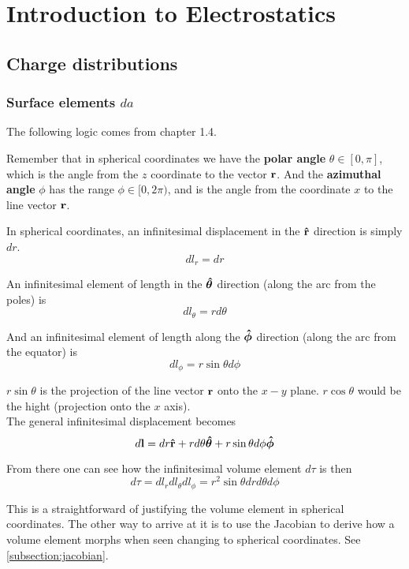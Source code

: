 \chapter{Introduction to Electrostatics}


\section{Charge distributions}


\subsection{Surface elements $da$}

The following logic comes from \cite{griffiths-em} chapter 1.4.

Remember that in spherical coordinates we have the \textbf{polar angle} $\theta \in [0, \pi]$,
which is the angle from the $z$ coordinate to the vector $\boldsymbol{\mathbf{r}}$.
And the \textbf{azimuthal angle} $\phi$ has the range $\phi \in [0, 2\pi)$, and is the angle from
the coordinate $x$ to the line vector $\boldsymbol{\mathbf{r}}$.

In spherical coordinates, an infinitesimal displacement in the $\boldsymbol{\mathbf{\hat{r}}}$ direction is
simply $dr$.
$$
dl_r = dr
$$

An infinitesimal element of length in the $\boldsymbol{\mathbf{\hat{\theta}}}$ direction (along the arc from the poles)
is
$$
dl_\theta = r d\theta
$$

And an infinitesimal element of length along the $\boldsymbol{\mathbf{\hat{\phi}}}$ direction (along the arc from the equator)
is
$$
dl_\phi = r \sin\theta d\phi
$$

$r \sin\theta$ is the projection of the line vector $\boldsymbol{\mathbf{r}}$ onto the $x-y$ plane.
$r \cos\theta$ would be the hight (projection onto the $x$ axis).
\\

The general infinitesimal displacement becomes
$$
d\boldsymbol{\mathbf{l}} =
dr \boldsymbol{\mathbf{\hat{r}}}
+ r d\theta \boldsymbol{\mathbf{\hat{\theta}}}
+ r \sin\theta d\phi \boldsymbol{\mathbf{\hat{\phi}}}
$$

From there one can see how the infinitesimal volume element $d\tau$ is then
$$
d\tau = dl_r dl_\theta dl_\phi =
r^2 \sin\theta dr d\theta d\phi
$$

This is a straightforward of justifying the volume element in spherical coordinates.
The other way to arrive at it is to use the Jacobian to derive how a volume element morphs when seen
changing to spherical coordinates.
See \ref{subsection:jacobian}.
\\


